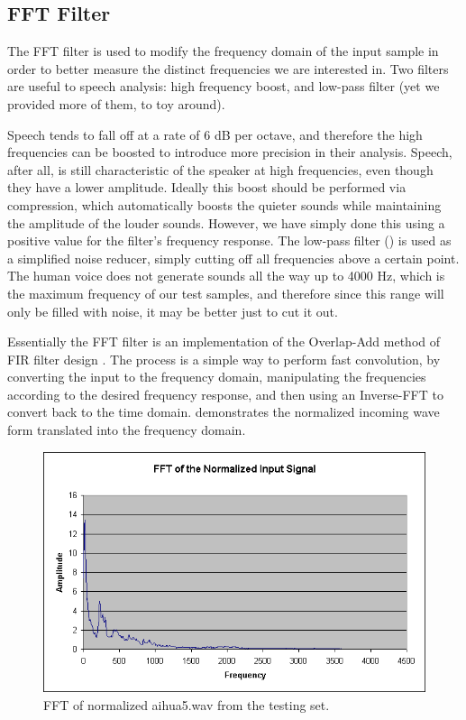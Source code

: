 \subsection{FFT Filter}\label{sect:fft-filter}

The FFT filter is used to modify the frequency domain of the input sample in
order to better measure the distinct frequencies we are interested in.
Two filters are useful to speech analysis: high frequency boost, and low-pass
filter (yet we provided more of them, to toy around).

Speech tends to fall off at a rate of 6 dB per octave, and therefore the high
frequencies can be boosted to introduce more precision in their analysis.
Speech, after all, is still characteristic of the speaker at high frequencies,
even though they have a lower amplitude.  Ideally this boost should be performed
via compression, which automatically boosts the quieter sounds while maintaining
the amplitude of the louder sounds.  However, we have simply done this using a
positive value for the filter's frequency response.
The low-pass filter () is used as a simplified noise reducer, simply cutting off
all frequencies above a certain point.  The human voice does not generate sounds
all the way up to 4000 Hz, which is the maximum frequency of our test samples,
and therefore since this range will only be filled with noise, it may be better
just to cut it out.

Essentially the FFT filter is an implementation of the Overlap-Add method of FIR
filter design \cite{dspdimension}.  The process is a simple way to perform fast convolution, by
converting the input to the frequency domain, manipulating the frequencies
according to the desired frequency response, and then using an Inverse-FFT to
convert back to the time domain.  demonstrates
the normalized incoming wave form translated into the frequency domain.

\begin{figure}
	\centering
	\includegraphics[width=400pt]{../graphics/graphs/fft.png}
	\caption{FFT of normalized aihua5.wav from the testing set.}
	\label{fig:fft-filter}
\end{figure}


